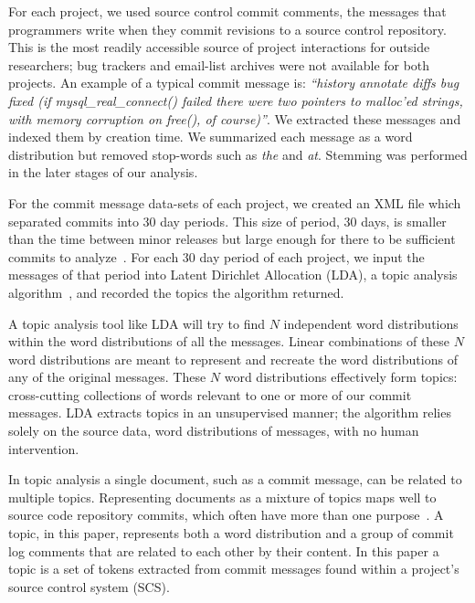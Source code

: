 \documentclass[]{sig-alternate}
\begin{document}
For each project, we used source control commit comments, the messages that programmers write when they commit revisions to a source control repository. 
This is the most readily accessible source of project interactions for outside researchers; bug trackers and email-list archives were not available for both projects. 
An example of a typical commit message is: \textit{``history annotate diffs bug fixed (if mysql\-\_real\-\_connect() failed there were two pointers to malloc'ed strings, with memory corruption on free(), of course)''}. 
We extracted these messages and indexed them by creation time. 
We summarized each message as a word distribution but removed stop-words such as \emph{the} and \emph{at}. 
Stemming was performed in the later stages of our analysis. %

For the commit message data-sets of each project, we created an XML file which separated commits into 30 day periods. 
This size of period, 30 days, is smaller than the time between minor releases but large enough for there to be sufficient commits to analyze~\cite{Hindle09ICSM}. 
For each 30 day period of each project, we input the messages of that period into Latent Dirichlet Allocation (LDA), a topic analysis algorithm~\cite{Blei2003}, and recorded the topics the algorithm returned.

A topic analysis tool like LDA will try to find $N$ independent word distributions within the word distributions of all the messages. 
Linear combinations of these $N$ word distributions are meant to represent and recreate the word distributions of any of the original messages. 
These $N$ word distributions effectively form topics: cross-cutting collections of words relevant to one or more of our commit messages. 
LDA extracts topics in an unsupervised manner; the algorithm relies solely on the source data, word distributions of messages, with no human intervention.

In topic analysis a single document, such as a commit message, can be related to multiple topics. 
Representing documents as a mixture of topics maps well to source code repository commits, which often have more than one purpose~\cite{Hindle09ICSM}.  
A topic, in this paper, represents both a word distribution and a group of commit log comments that are related to each other by their content.  
In this paper a topic is a set of tokens extracted from commit messages found within a project's source control system (SCS).
\end{document}
